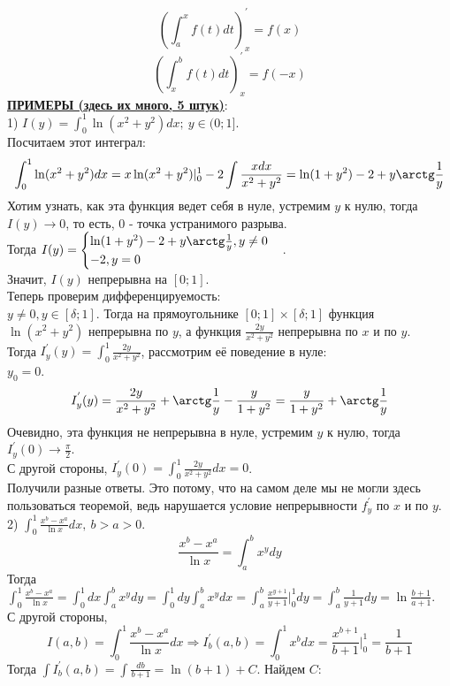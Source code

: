 \documentclass[12pt]{article}
\begin{document}
$$(\int_a^x f(t) dt)^{'}_x = f(x)$$
$$(\int_x^b f(t) dt)^{'}_x = f(-x)$$
\uline{\textbf{ПРИМЕРЫ (здесь их много, 5 штук)}}:\\
1) $I(y) = \int_0^1 \ln(x^2+y^2) dx; \ y\in (0;1]$.\\
Посчитаем этот интеграл:\\
$$\int_0^1 \ln (x^2+y^2) dx = x \ln (x^2 + y^2) |_0^1 - 2 \int \frac{xdx}{x^2+y^2} = \ln (1+y^2) - 2 + y \arctg \frac{1}{y}$$
Хотим узнать, как эта функция ведет себя в нуле, устремим $y$ к нулю, тогда $I(y) \to 0$, то есть, $0$ - точка устранимого разрыва.\\
Тогда $I(y) = \begin{cases} \ln (1+y^2) - 2 + y \arctg \frac{1}{y}, y \neq 0 \\ -2, y = 0 \end{cases}$.\\
Значит, $I(y)$ непрерывна на $[0;1]$.\\
Теперь проверим дифференцируемость:\\
$y \neq 0, y \in [\delta; 1]$. Тогда на прямоугольнике $[0;1] \times [\delta; 1]$ функция $\ln (x^2+y^2)$ непрерывна по $y$, а функция $\frac{2y}{x^2+y^2}$ непрерывна по $x$ и по $y$.\\
Тогда $I^{'}_y(y) = \int_0^1 \frac{2y}{x^2+y^2}$, рассмотрим её поведение в нуле:\\
$y_0 = 0$.\\
$$I^{'}_y(y) = \frac{2y}{x^2+y^2} + \arctg \frac{1}{y} - \frac{y}{1+y^2} = \frac{y}{1+y^2} + \arctg \frac{1}{y}$$
Очевидно, эта функция не непрерывна в нуле, устремим $y$ к нулю, тогда $I^{'}_y(0) \to \frac{\pi}{2}$.\\
С другой стороны, $I^{'}_y(0) = \int_0^1 \frac{2y}{x^2+y^2} dx = 0$.\\
Получили разные ответы. Это потому, что на самом деле мы не могли здесь пользоваться теоремой, ведь нарушается условие непрерывности $f^{'}_y$ по $x$ и по $y$.\\
2) $\int_0^1 \frac{x^b-x^a}{\ln x} dx, \ b > a > 0$.\\
$$\frac{x^b - x^a}{\ln x} = \int_a^b x^y dy$$
Тогда $\int_0^1 \frac{x^b-x^a}{\ln x} = \int_0^1 dx \int_a^b x^y dy = \int_0^1 dy \int_a^b x^y dx = \int_a^b \frac{x^{y+1}}{y+1} |_0^1 dy = \int_a^b \frac{1}{y+1} dy = \ln \frac{b+1}{a+1}$.\\
С другой стороны,\\
$$I(a,b) = \int_0^1 \frac{x^b - x^a}{\ln x} dx \Rightarrow I^{'}_b (a,b) = \int_0^1 x^b dx = \frac{x^{b+1}}{b+1} |_0^1 = \frac{1}{b+1}$$
Тогда $\int I^{'}_b (a,b) = \int \frac{db}{b+1} = \ln (b+1) + C$. Найдем $C$:\\
\end{document}
